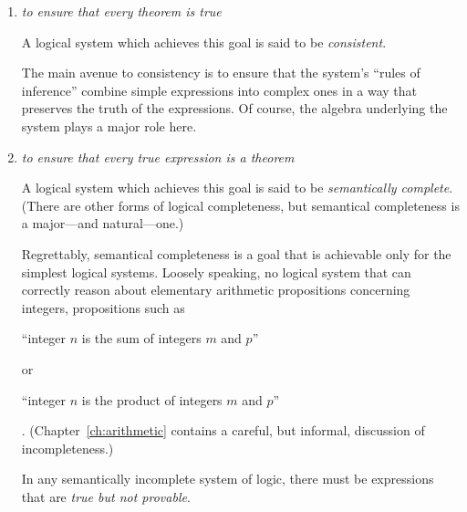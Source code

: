 \begin{enumerate}
\item
{\em to ensure that every theorem is true}

\smallskip


A logical system which achieves this goal is said to be {\it consistent}. 

\smallskip 

The main avenue to consistency is to ensure that the system's ``rules of inference'' combine simple expressions into complex ones in a way that preserves the truth of the expressions.  Of course, the algebra underlying the system plays a major role here.

\item
{\em to ensure that every true expression is a theorem}

\smallskip


A logical system which achieves this goal is said to be {\it semantically complete}.  (There are other forms of logical completeness, but semantical completeness is a major---and natural---one.)

\smallskip

Regrettably, semantical completeness is a goal that is achievable only for the simplest logical systems.  Loosely speaking, no logical system that can correctly reason about elementary arithmetic propositions concerning integers, propositions such as

\smallskip

\hspace*{.25in}
``integer $n$ is the sum of integers $m$ and $p$''

\noindent or

\hspace*{.25in}
 ``integer $n$ is the product of integers $m$ and $p$''

\smallskip

.  (Chapter~\ref{ch:arithmetic} contains a careful, but informal, discussion of incompleteness.)

\smallskip

In any semantically incomplete system of logic, there must be expressions that are {\em true but not provable}.
\end{enumerate}

\medskip

\noindent {}

